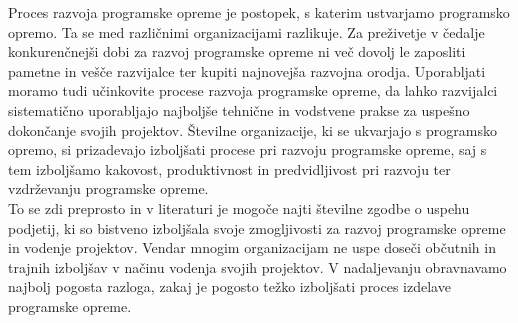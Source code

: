 \documentclass[a4paper,12pt,openright]{book}
\begin{document}
Proces razvoja programske opreme je postopek, s katerim ustvarjamo programsko opremo. Ta se med različnimi organizacijami razlikuje. Za preživetje v čedalje konkurenčnejši dobi za razvoj programske opreme ni več dovolj le zaposliti pametne in vešče razvijalce ter kupiti najnovejša razvojna orodja. Uporabljati moramo tudi učinkovite procese razvoja programske opreme, da lahko razvijalci sistematično uporabljajo najboljše tehnične in vodstvene prakse za uspešno dokončanje svojih projektov. Številne organizacije, ki se ukvarjajo s programsko opremo, si prizadevajo izboljšati procese pri razvoju programske opreme, saj s tem izboljšamo kakovost, produktivnost in predvidljivost pri razvoju ter vzdrževanju programske opreme. \\
To se zdi preprosto in v literaturi je mogoče najti številne zgodbe o uspehu podjetij, ki so bistveno izboljšala svoje zmogljivosti za razvoj programske opreme in vodenje projektov. Vendar mnogim organizacijam ne uspe doseči občutnih in trajnih izboljšav v načinu vodenja svojih projektov. V nadaljevanju obravnavamo najbolj pogosta razloga, zakaj je pogosto težko izboljšati proces izdelave programske opreme.
\cite{aggarwal2005software, humphrey1989managing}
\end{document}
